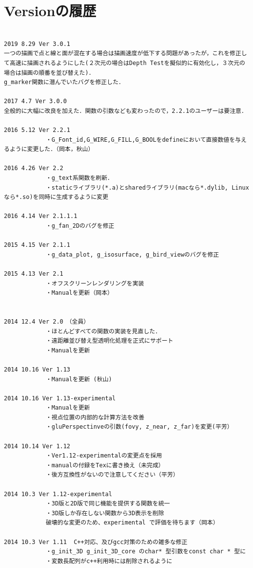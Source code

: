 \documentclass[platex,a4paper,12pt]{jsarticle}%
\begin{document}
\newpage
\section{Versionの履歴}

\begin{verbatim}

2019 8.29 Ver 3.0.1
一つの描画で点と線と面が混在する場合は描画速度が低下する問題があったが，これを修正して高速に描画されるようにした(２次元の場合はDepth Testを擬似的に有効化し，３次元の場合は描画の順番を並び替えた)．
g_marker関数に潜んでいたバグを修正した．

2017 4.7 Ver 3.0.0
全般的に大幅に改良を加えた．関数の引数なども変わったので，2.2.1のユーザーは要注意．

2016 5.12 Ver 2.2.1
			・G_Font_id,G_WIRE,G_FILL,G_BOOLをdefineにおいて直接数値を与えるように変更した．（岡本，秋山）
			
2016 4.26 Ver 2.2
			・g_text系関数を刷新．
			・staticライブラリ(*.a)とsharedライブラリ(macなら*.dylib, Linuxなら*.so)を同時に生成するように変更
			
2016 4.14 Ver 2.1.1.1
			・g_fan_2Dのバグを修正

2015 4.15 Ver 2.1.1
			・g_data_plot, g_isosurface, g_bird_viewのバグを修正

2015 4.13 Ver 2.1   
			・オフスクリーンレンダリングを実装
			・Manualを更新（岡本）


2014 12.4 Ver 2.0　（全員）
			・ほとんどすべての関数の実装を見直した．
			・遠距離並び替え型透明化処理を正式にサポート
			・Manualを更新
			
2014 10.16 Ver 1.13
			・Manualを更新 (秋山)

2014 10.16 Ver 1.13-experimental
			・Manualを更新
			・視点位置の内部的な計算方法を改善
			・gluPerspectinveの引数(fovy, z_near, z_far)を変更(平芳）

2014 10.14 Ver 1.12
			・Ver1.12-experimentalの変更点を採用
			・manualの付録をTexに書き換え（未完成）
			・後方互換性がないので注意してください（平芳）

2014 10.3 Ver 1.12-experimental
			・3D版と2D版で同じ機能を提供する関数を統一
			・3D版しか存在しない関数から3D表示を削除
			破壊的な変更のため、experimental で評価を待ちます（岡本）

2014 10.3 Ver 1.11	C++対応、及びgcc対策のための雑多な修正
			・g_init_3D g_init_3D_core のchar* 型引数をconst char * 型に
			・変数長配列がc++利用時には削除されるように


\end{verbatim}
\end{document}
